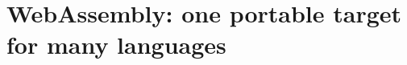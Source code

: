 \chapter{WebAssembly: one portable target for many languages}
\label{ch:webassembly-one-portable-target-for}

